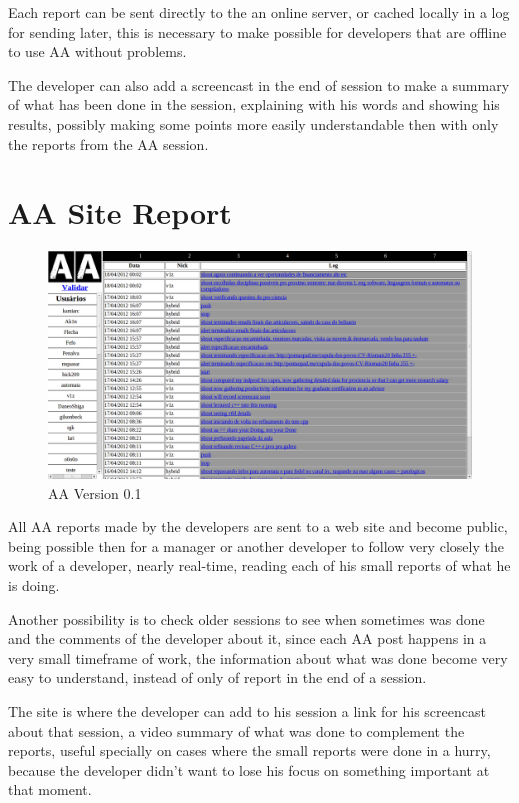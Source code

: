 \documentclass[letterpaper]{article}
\begin{document}
Each report can be sent directly to the an online server, or cached locally in
a log for sending later, this is necessary to make possible for developers that are
offline to use AA without problems.

The developer can also add a screencast in the end of session to make a summary
of what has been done in the session, explaining with his words and showing his
results, possibly making some points more easily understandable then with only
the reports from the AA session.

\section{AA Site Report}

\begin{figure}
\begin{center}
   \includegraphics[width=0.8\linewidth,keepaspectratio=true]{figs/aa-0.1.png}
\end{center}
   \caption{
   AA Version 0.1
   }
\label{fig:mm}
\end{figure}

All AA reports made by the developers are sent to a web site and become public,
being possible then for a manager or another developer to follow very closely
the work of a developer, nearly real-time, reading each of his small reports of
what he is doing.

Another possibility is to check older sessions to see when sometimes was done
and the comments of the developer about it, since each AA post happens in a
very small timeframe of work, the information about what was done become very
easy to understand, instead of only of report in the end of a session.

The site is where the developer can add to his session a link for his
screencast about that session, a video summary of what was done to complement
the reports, useful specially on cases where the small reports were done in a
hurry, because the developer didn't want to lose his focus on something
important at that moment.
\end{document}
